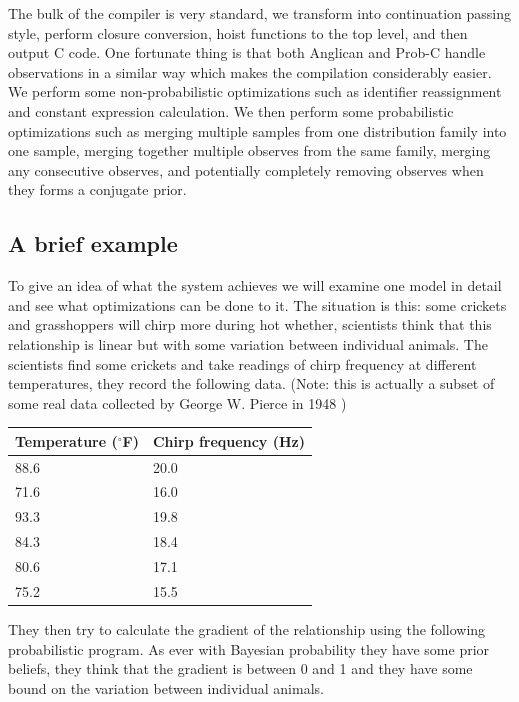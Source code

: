 \documentclass[a4paper]{article}
\begin{document}
The bulk of the compiler is very standard, we transform into continuation passing style, perform closure conversion, hoist functions to the top level, and then output C code. One fortunate thing is that both Anglican and Prob-C handle observations in a similar way which makes the compilation considerably easier. We perform some non-probabilistic optimizations such as identifier reassignment and constant expression calculation. We then perform some probabilistic optimizations such as merging multiple samples from one distribution family into one sample, merging together multiple observes from the same family, merging any consecutive observes, and potentially completely removing observes when they forms a conjugate prior.



\subsection{A brief example}

To give an idea of what the system achieves we will examine one model in detail and see what optimizations can be done to it. The situation is this: some crickets and grasshoppers will chirp more during hot whether, scientists think that this relationship is linear but with some variation between individual animals. The scientists find some crickets and take readings of chirp frequency at different temperatures, they record the following data. (Note: this is actually a subset of some real data collected by George W. Pierce in 1948 \cite{Crickets})

\begin{center}
	\def\arraystretch{1.3}
	\begin{tabular}{l|l}
		Temperature (\(^\circ\)F) & Chirp frequency (Hz) \\
		\hline
		88.6 & 20.0 \\
		71.6 & 16.0 \\
		93.3 & 19.8 \\
		84.3 & 18.4 \\
		80.6 & 17.1 \\
		75.2 & 15.5
	\end{tabular}
\end{center}
They then try to calculate the gradient of the relationship using the following probabilistic program. As ever with Bayesian probability they have some prior beliefs, they think that the gradient is between 0 and 1 and they have some bound on the variation between individual animals.
\end{document}
